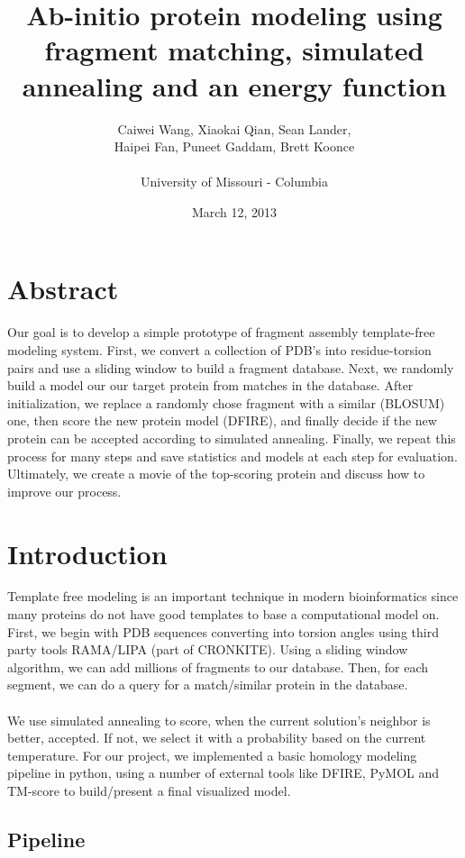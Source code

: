 \documentclass{article}
\title{Ab-initio protein modeling using fragment matching, simulated annealing and an energy function}
\author{Caiwei Wang, Xiaokai Qian, Sean Lander, \\Haipei Fan, Puneet Gaddam, Brett Koonce\\\\University of Missouri - Columbia}
\date{March 12, 2013}
\begin{document}
\maketitle

\section{Abstract}
Our goal is to develop a simple prototype of fragment assembly template-free modeling system. First, we convert a collection of PDB's into residue-torsion pairs and use a sliding window to build a fragment database. Next, we randomly build a model our our target protein from matches in the database. After initialization, we replace a randomly chose fragment with a similar (BLOSUM) one, then score the new protein model (DFIRE), and finally decide if the new protein can be accepted according to simulated annealing. Finally, we repeat this process for many steps and save statistics and models at each step for evaluation. Ultimately, we create a movie of the top-scoring protein and discuss how to improve our process.

\section{Introduction}

Template free modeling is an important technique in modern bioinformatics since many proteins do not have good templates to base a computational model on. First, we begin with PDB sequences converting into torsion angles using third party tools RAMA/LIPA (part of CRONKITE). Using a sliding window algorithm, we can add millions of fragments to our database. Then, for each segment, we can do a query for a match/similar protein in the database.\\\\
We use simulated annealing to score, when the current solution’s neighbor is better, accepted. If not, we select it with a probability based on the current temperature. For our project, we implemented a basic homology modeling pipeline in python, using a number of external tools like DFIRE, PyMOL and TM-score to build/present a final visualized model.


\subsection{Pipeline}
\end{document}
